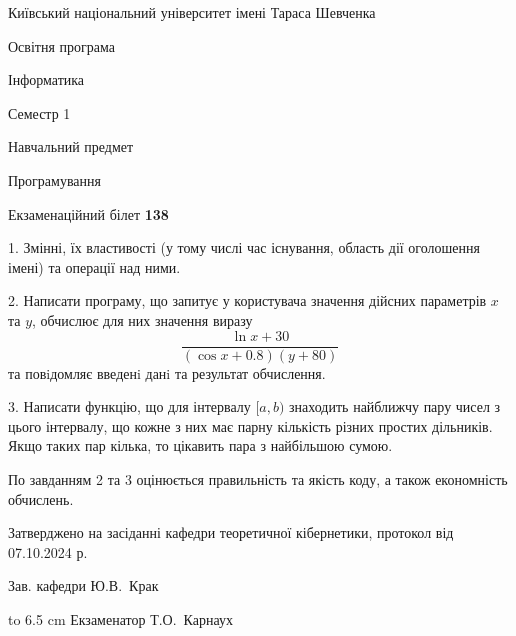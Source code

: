 \documentclass[12pt, ukrainian]{article}
\begin{document}
{{\begin {scriptsize}\par
{ \center  Київський національний університет імені Тараса Шевченка \par}
{\parbox {5 cm}{Освітня програма \hfill}{\parbox {7 cm}{Інформатика\hfill}}\parbox {6 cm}{\hfill Семестр 1}}\par
{\parbox {5 cm} {Навчальний предмет \hfill}\parbox {7 cm}{Програмування \hfill}\parbox {6cm}{\hfill}\par}\vspace{-15pt} \end{scriptsize}}{\center Екзаменаційний білет \No \textbf { 138 }\par}}
{%
1. Змінні, їх властивості (у тому числі час існування, область дії оголошення імені) та операції над ними.%
\par
2. Написати програму, що запитує у користувача значення дійсних параметрів $x$ та $y$, обчислює для них значення виразу 
$$\frac{\ln x + 30}{(\cos x + 0.8) (y + 80)}$$ 
та повiдомляє введенi данi та результат обчислення.

\par
3. Написати функцію, що для інтервалу $[a, b)$ знаходить найближчу пару чисел з цього інтервалу, що кожне з них має парну кількість різних простих дільників. Якщо таких пар кілька, то цікавить пара з найбільшою сумою.

По завданням 2 та 3 оцінюється правильність та якість коду, а також економність обчислень.

}
{\smallskip\smallskip \begin {scriptsize} Затверджено на засіданні кафедри теоретичної кібернетики, протокол   від   07.10.2024 р.\par\smallskip\smallskip\smallskip\smallskip
{\parbox {6.5 cm} {Зав. кафедри \dotfill Ю.В.~Крак}}\hspace {0.7cm} {\hbox to 6.5 cm { Екзаменатор \dotfill Т.О.~Карнаух}} \end{scriptsize}}
\newpage
\end{document}
